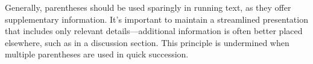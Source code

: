 


\noindent Generally, parentheses should be used sparingly in running text, as they offer supplementary information.
It's important to maintain a streamlined presentation that includes only relevant details---additional information is often better placed elsewhere, such as in a discussion section.
This principle is undermined when multiple parentheses are used in quick succession.
